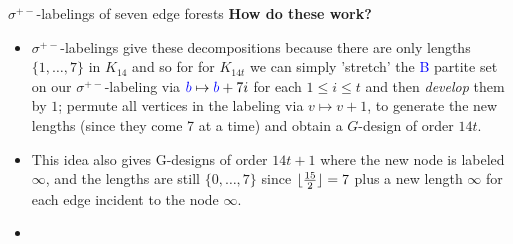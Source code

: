 \documentclass[xcolor=x11names,compress,8pt]{beamer}
\theoremstyle{plain}
\DeclarePairedDelimiter\floor{\lfloor}{\rfloor} %
\begin{document}
    \begin{frame}{$\sigma^{+-}$-labelings of seven edge forests}
        \textbf{How do these work?}\newline
        \pause
        \begin{itemize}
            \item $\sigma^{+-}$-labelings give these decompositions because there are only lengths $\{1,\hdots,7\}$ in $K_{14}$ and so for for $K_{14t}$ we can simply 'stretch' the \textcolor{blue}{B} partite set on our $\sigma^{+-}$-labeling via $\textcolor{blue}{b}\mapsto \textcolor{blue}{b}+7i$ for each $1\leq i\leq t$ and then \textit{develop} them by $1$; permute all vertices in the labeling via $v\mapsto v+1$,  to generate the new lengths (since they come 7 at a time) and obtain a $G$-design of order $14t$. 
            \pause
            \item This idea also gives G-designs of order $14t+1$ where the new node is labeled $\infty$, and the lengths are still $\{0,\hdots,7\}$ since $\floor{\frac{15}{2}}=7$ plus a new length $\infty$ for each edge incident to the node $\infty$.
            \pause
            \item 

        \end{itemize}

    \end{frame}
\end{document}
